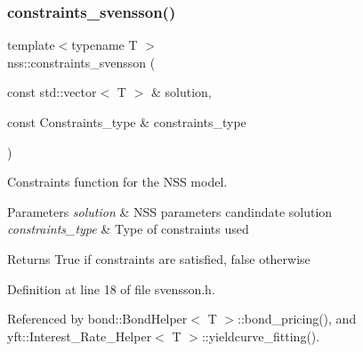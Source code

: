 \subsubsection{\texorpdfstring{constraints\+\_\+svensson()}{constraints\_svensson()}}
{\footnotesize\ttfamily template$<$typename T $>$ \\
nss\+::constraints\+\_\+svensson (\begin{DoxyParamCaption}\item[{const std\+::vector$<$ T $>$ \&}]{solution,  }\item[{const Constraints\+\_\+type \&}]{constraints\+\_\+type }\end{DoxyParamCaption})}



Constraints function for the N\+SS model. 


\begin{DoxyParams}{Parameters}
{\em solution} & N\+SS parameters candindate solution \\
\hline
{\em constraints\+\_\+type} & Type of constraints used \\
\hline
\end{DoxyParams}
\begin{DoxyReturn}{Returns}
True if constraints are satisfied, false otherwise 
\end{DoxyReturn}


Definition at line 18 of file svensson.\+h.



Referenced by bond\+::\+Bond\+Helper$<$ T $>$\+::bond\+\_\+pricing(), and yft\+::\+Interest\+\_\+\+Rate\+\_\+\+Helper$<$ T $>$\+::yieldcurve\+\_\+fitting().



